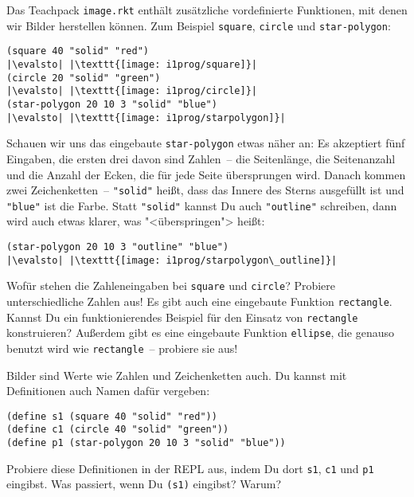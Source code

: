 Das Teachpack \texttt{image.rkt} enthält zusätzliche vordefinierte
Funktionen, mit denen wir Bilder herstellen können.  Zum Beispiel
\lstinline{square}, \lstinline{circle} und \lstinline{star-polygon}:
%
\begin{lstlisting}
(square 40 "solid" "red")
|\evalsto| |\texttt{[image: i1prog/square]}|
(circle 20 "solid" "green")
|\evalsto| |\texttt{[image: i1prog/circle]}|
(star-polygon 20 10 3 "solid" "blue")
|\evalsto| |\texttt{[image: i1prog/starpolygon]}|
\end{lstlisting}
%
Schauen wir uns das eingebaute \lstinline{star-polygon} etwas näher an:
Es akzeptiert fünf Eingaben, die ersten drei davon sind Zahlen~-- die
Seitenlänge, die Seitenanzahl und die Anzahl der Ecken, die für jede
Seite übersprungen wird.  Danach kommen zwei Zeichenketten~--
\lstinline{"solid"} heißt, dass das Innere des Sterns ausgefüllt ist und
\lstinline{"blue"} ist die Farbe.  Statt \lstinline{"solid"} kannst Du auch
\lstinline{"outline"} schreiben, dann wird auch etwas klarer, was
"<überspringen"> heißt:
%
\begin{lstlisting}
(star-polygon 20 10 3 "outline" "blue")
|\evalsto| |\texttt{[image: i1prog/starpolygon\_outline]}|
\end{lstlisting}
%
\begin{aufgabeinline}
  Wofür stehen die Zahleneingaben bei \lstinline{square} und
  \lstinline{circle}?  Probiere unterschiedliche Zahlen aus!  Es gibt
  auch eine eingebaute Funktion \lstinline{rectangle}.  Kannst Du ein
  funktionierendes Beispiel für den Einsatz von \lstinline{rectangle}
  konstruieren?  Außerdem gibt es eine eingebaute Funktion
  \lstinline{ellipse}, die genauso benutzt wird wie \lstinline{rectangle}~--
  probiere sie aus!
\end{aufgabeinline}
%
Bilder sind Werte wie Zahlen und Zeichenketten auch.  Du kannst
mit Definitionen auch Namen dafür vergeben:
%
\begin{lstlisting}
(define s1 (square 40 "solid" "red"))
(define c1 (circle 40 "solid" "green"))
(define p1 (star-polygon 20 10 3 "solid" "blue"))
\end{lstlisting}
%
\begin{aufgabeinline}
  Probiere diese Definitionen in der REPL aus, indem Du dort
  \lstinline{s1}, \lstinline{c1} und \lstinline{p1} eingibst.  Was
  passiert, wenn Du \lstinline{(s1)} eingibst?  Warum?
\end{aufgabeinline}

